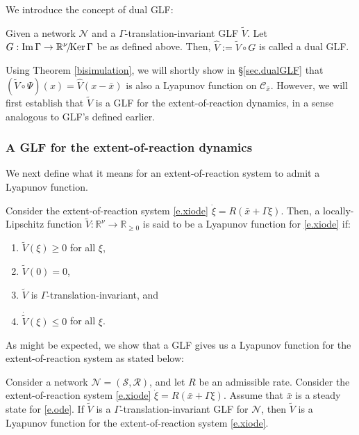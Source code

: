 \documentclass[onefignum,onetabnum]{siamonline220329}
\newcommand\bx{{\bar x}}
\newcommand{\tV}{{\widetilde{V}}}
\newcommand{\hV}{{\widehat{V}}}
\renewcommand{\Im}{{\mathop{\rm Im\,}}}
\newcommand{\Rs}{{\mathscr R}}
\newcommand{\Ss}{{\mathscr S}}
\newcommand{\Ns}{{\mathscr N}}
\newcommand{\Cs}{\mathscr C}
\renewcommand{\ker}{{\mathop{\rm Ker\,}}}
\newcommand{\Imgamma}{\Im \Gamma}
\newcommand{\kerGamma}{\ker \Gamma}
\begin{document}
{We introduce the concept of dual GLF:

\begin{definition}\label{def.hV_}
Given a network $\Ns$ and a $\Gamma${-translation}-invariant GLF $\tV$. Let $G:\Imgamma\to\mathbb R^\nu\!/\!\kerGamma$ be as defined above. Then, $\hV:=\tV\circ G$ is called a dual GLF.
\end{definition}
 
Using Theorem \ref{bisimulation}, we will shortly show in \S\ref{sec.dualGLF} that $(\tV\circ\Psi)(x)=\hV(x-\bx)$ is also a Lyapunov function on $\Cs_\bx$.
However, we will first establish that $\tV$ {is} a GLF for the extent-of-reaction dynamics, in a sense analogous to GLF's defined earlier.
 
\subsubsection{A GLF for the extent-of-reaction dynamics} 

We next define what it means for an extent-of-reaction system to admit a Lyapunov function.

\begin{definition}\label{def.xi_lyap}
Consider the extent-of-reaction system \eqref{e.xiode} $\dot\xi=R(\bx+\Gamma\xi)$. Then, a locally-Lipschitz function $\tV:\mathbb R^\nu\to\mathbb R_{\ge0}$ is said to be a Lyapunov function for \eqref{e.xiode} if:
\begin{enumerate}
  \item 
  $\tV(\xi)\ge0$ for all $\xi$,
  \item 
  $\tV(0)=0$,
  \item 
  $\tV$ is $\Gamma$-translation-invariant, and
  \item
  $\dot\tV(\xi)\le0$ for all $\xi$. 
\end{enumerate}
\end{definition}

As might be expected, we show that a GLF gives us a Lyapunov function for the extent-of-reaction system as stated below:

\begin{proposition}
\label{xi_GLF}
Consider a network $\Ns=(\Ss,\Rs)$,  and let $R$ be an admissible rate. Consider the extent-of-reaction system \eqref{e.xiode} $\dot\xi=R(\bx+\Gamma\xi)$. Assume that $\bx$ is a steady state for \eqref{e.ode}. If   $\tV$ is a $\Gamma$-translation{-}invariant GLF for $\Ns$, then $\tV$ {is} a Lyapunov function for the extent-of-reaction system \eqref{e.xiode}. 
\end{proposition}

}
\end{document}
